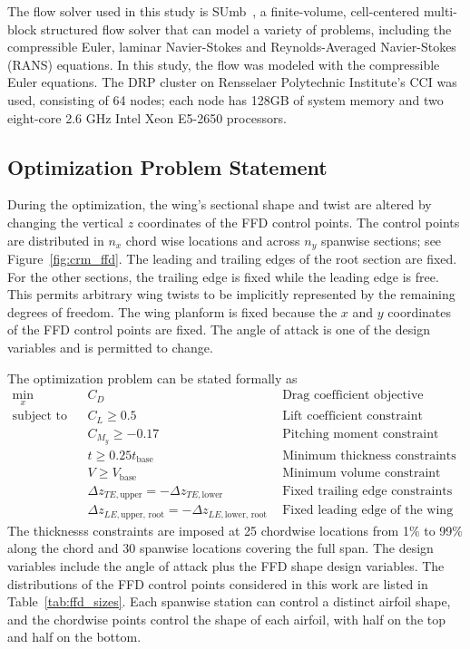 The flow solver used in this study is SUmb~\cite{sumb_pdf}, a finite-volume, cell-centered multi-block structured  flow solver that can model a variety  of problems, including the compressible Euler, laminar Navier-Stokes and Reynolds-Averaged Navier-Stokes (RANS) equations. In this study, the flow was modeled with the compressible Euler equations. The DRP cluster on Rensselaer Polytechnic Institute's CCI was used, consisting of 64 nodes; each node has 128GB of system memory and two eight-core 2.6 GHz Intel Xeon E5-2650 processors. 

\subsection{Optimization Problem Statement}
During the optimization, the wing's sectional shape and twist are altered 
by changing the vertical $z$ coordinates 
of the FFD control points. The control points are distributed in $n_x$ chord wise locations and across  $n_y$ spanwise sections;  see Figure~\ref{fig:crm_ffd}. The leading and trailing edges of the root section are fixed. For the other sections, the trailing edge is fixed while the leading edge is free. This permits arbitrary wing twists to be implicitly represented by the remaining degrees of freedom. The wing planform is fixed because the $x$ and $y$ coordinates of the FFD control points are fixed. The angle of attack is one of the design variables and is permitted to change.  

The optimization problem can be stated formally as
\begin{equation*}
  \begin{alignedat}{2}
    \underset{x}{\text{min}} \quad & C_D && \text{Drag coefficient objective}   \\
    \text{subject to} \quad & C_L \geq 0.5  && \text{Lift coefficient constraint}   \\
      & C_{M_y} \geq -0.17          && \text{Pitching moment constraint}   \\
      & t \geq 0.25 t_{\text{base}} && \text{Minimum thickness constraints}   \\
      & V \geq V_{\text{base}} && \text{Minimum volume constraint}   \\
      & \Delta z_{TE, \text{upper}} = -\Delta z_{TE, \text{lower}}  && \text{Fixed trailing edge constraints}   \\
      & \Delta z_{LE, \text{upper, root}} = -\Delta z_{LE, \text{lower, root}} && \text{Fixed leading edge of the wing root}  
  \end{alignedat}
\end{equation*}
The thicknesss constraints are imposed at 25 chordwise locations from 1\% to 99\% along the chord and 30 spanwise locations covering the full span.  The design variables include the angle of attack plus the FFD shape design variables. The distributions of the FFD control points considered in this work are listed in Table~\ref{tab:ffd_sizes}. Each spanwise station can control a distinct airfoil shape, and the chordwise points control the shape of each airfoil, with half on the top and half on the bottom.  
 
